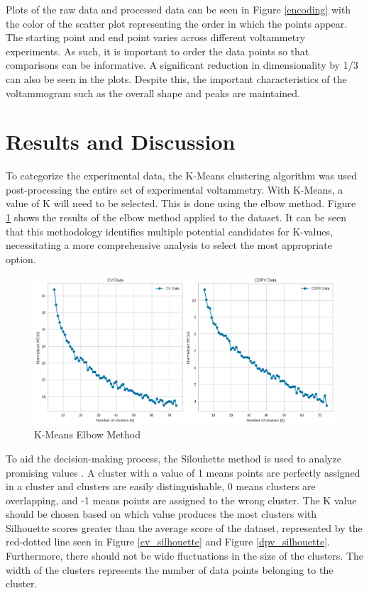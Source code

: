 Plots of the raw data and processed data can be seen in Figure \ref{encoding} with the color of the scatter plot representing the order in which the points appear. The starting point and end point varies across different voltammetry experiments. As such, it is important to order the data points so that comparisons can be informative. A significant reduction in dimensionality by 1/3 can also be seen in the plots. Despite this, the important characteristics of the voltammogram such as the overall shape and peaks are maintained.
\section{Results and Discussion}
To categorize the experimental data, the K-Means clustering algorithm was used post-processing the entire set of experimental voltammetry. With K-Means, a value of K will need to be selected. This is done using the elbow method. Figure \ref{elbow} shows the results of the elbow method applied to the dataset. It can be seen that this methodology identifies multiple potential candidates for K-values, necessitating a more comprehensive analysis to select the most appropriate option. 
\begin{figure}[h!]
  \centering
    \includegraphics[width=1.0\textwidth]{figures/elbowmethod.png}
    \caption{K-Means Elbow Method}
    \label{elbow}
\end{figure}
To aid the decision-making process, the Silouhette method is used to analyze promising values \cite{ROUSSEEUW198753}. A cluster with a value of 1 means points are perfectly assigned in a cluster and clusters are easily distinguishable, 0 means clusters are overlapping, and -1 means points are assigned to the wrong cluster. The K value should be chosen based on which value produces the most clusters with Silhouette scores greater than the average score of the dataset, represented by the red-dotted line seen in Figure \ref{cv_silhouette} and Figure \ref{dpv_silhouette}. Furthermore, there should not be wide fluctuations in the size of the clusters. The width of the clusters represents the number of data points belonging to the cluster. 
